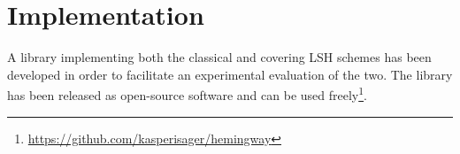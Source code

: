 \section{Implementation}
\label{implementation}

A library implementing both the classical and covering LSH schemes has been developed in order to facilitate an experimental evaluation of the two. The library has been released as open-source software and can be used freely\footnote{\url{https://github.com/kasperisager/hemingway}}.
